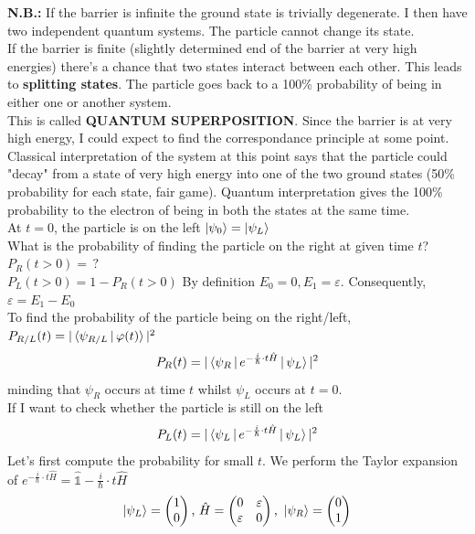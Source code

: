 \textbf{N.B.:} If the barrier is infinite the ground state is trivially degenerate. I then have two independent quantum systems. The particle cannot change its state.\\
If the barrier is finite (slightly determined end of the barrier at very high energies) there's a chance that two states interact between each other. This leads to \textbf{splitting states}. The particle goes back to a 100\% probability of being in either one or another system.\\
This is called \textbf{QUANTUM SUPERPOSITION}.
\newline
Since the barrier is at very high energy, I could expect to find the correspondance principle at some point. Classical interpretation of the system at this point says that the particle could "decay" from a state of very high energy into one of the two ground states (50\% probability for each state, fair game). Quantum interpretation gives the 100\% probability to the electron of being in both the states at the same time.\\
\newline
At $t=0$, the  particle is on the left $\ket{\psi_0}=\ket{\psi_L}$ \\
What is the probability of finding the particle on the right at given time $t$?\\
$P_R(t>0)=\,?$\\
$P_L(t>0)=1-P_R(t>0)$
By definition $E_0=0, E_1= \varepsilon$. Consequently, $\varepsilon = E_1-E_0$\\
To find the probability of the particle being on the right/left, $P_{R/L}(t)=|\braket{\psi_{R/L}\,|\,\varphi(t)}|^2$\\
\[
P_R(t)=|\braket{\psi_R\,|\,e^{-\frac{i}{\hbar}\cdot t \hat{H}}\,|\,\psi_L}|^2
\]
minding that $\psi_R$ occurs at time $t$ whilst $\psi_L$ occurs at $t=0$.\\
If I want to check whether the particle is still on the left
\[
P_L(t)=|\braket{\psi_L\,|\,e^{-\frac{i}{\hbar}\cdot t \hat{H}}\,|\,\psi_L}|^2
\]
Let's first compute the probability for small $t$. We perform the Taylor expansion of $e^{-\frac{i}{\hbar}\cdot t \hat{H}} = \mathbb{\hat{1}}-\frac{i}{\hbar}\cdot t\hat{H}$
\[
\ket{\psi_L}=\begin{pmatrix}
1\\0
\end{pmatrix}
\text{, }
\hat{H}=
\begin{pmatrix}
0 & \varepsilon\\ \varepsilon & 0
\end{pmatrix}
\text{, }
\ket{\psi_R}=
\begin{pmatrix}
0\\1
\end{pmatrix}
\]
